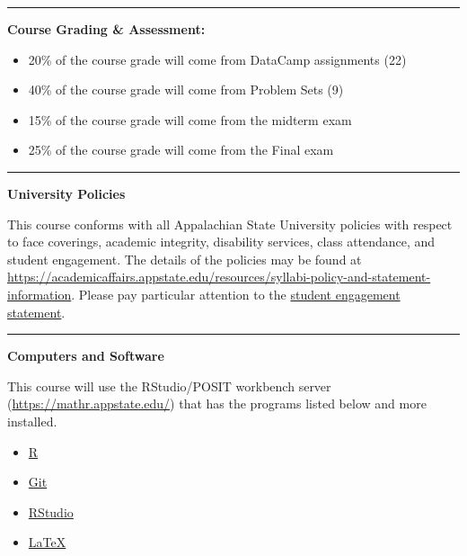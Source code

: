 \documentclass[
]{article}
\providecommand{\tightlist}{%
  \setlength{\itemsep}{0pt}\setlength{\parskip}{0pt}}
\begin{document}
\begin{center}\rule{0.5\linewidth}{0.5pt}\end{center}

\textbf{Course Grading \& Assessment:}

\begin{itemize}
\item
  20\% of the course grade will come from DataCamp assignments (22)
\item
  40\% of the course grade will come from Problem Sets (9)
\item
  15\% of the course grade will come from the midterm exam
\item
  25\% of the course grade will come from the Final exam
\end{itemize}

\begin{center}\rule{0.5\linewidth}{0.5pt}\end{center}

\textbf{University Policies}

This course conforms with all Appalachian State University policies with
respect to face coverings, academic integrity, disability services,
class attendance, and student engagement. The details of the policies
may be found at
\url{https://academicaffairs.appstate.edu/resources/syllabi-policy-and-statement-information}.
Please pay particular attention to the
\href{https://academicaffairs.appstate.edu/sites/academicaffairs.appstate.edu/files/gerber_resolution_student_workload_removed_approved_statement_per_mmccoughy_and_sedwards.pdf}{student
engagement statement}.

\begin{center}\rule{0.5\linewidth}{0.5pt}\end{center}

\textbf{Computers and Software}

This course will use the RStudio/POSIT workbench server
(\url{https://mathr.appstate.edu/}) that has the programs listed below
and more installed.

\begin{itemize}
\tightlist
\item
  \href{https://cran.r-project.org}{R}
\item
  \href{https://git-scm.com/downloads}{Git}
\item
  \href{https://www.rstudio.com/products/rstudio/download/}{RStudio}
\item
  \href{https://www.ctan.org/starter}{LaTeX}
\end{itemize}
\end{document}
